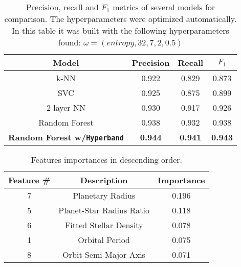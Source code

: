 \documentclass[11pt, a4paper]{article}
\begin{document}
  \begin{table}
    \centering
    \begin{tabular}{|c c c c|}
      \hline
      Model & Precision & Recall & $F_{1}$  \\
      \hline\hline
      k-NN & 0.922 & 0.829 & 0.873 \\
      \hline
      SVC & 0.925 & 0.875 & 0.899 \\
      \hline
      2-layer NN & 0.930 & 0.917 & 0.926 \\
      \hline
      Random Forest & 0.938 & 0.932 & 0.938 \\
      \hline
      \textbf{Random Forest w/\texttt{Hyperband}} & \textbf{0.944} & \textbf{0.941} & \textbf{0.943} \\
      \hline
    \end{tabular}
    \caption{Precision, recall and $F_{1}$ metrics of several models for comparison. The hyperparameters were optimized automatically. In this table it was built with the following hyperparameters found: $\omega = (entropy, 32, 7, 2, 0.5)$}
    \label{table:benchmark}
  \end{table}

  \begin{table}
    \centering
    \begin{tabular}{|c c c|}
    \hline
    Feature \# & Description & Importance \\
    \hline\hline
    7 & Planetary Radius & 0.196 \\
    5 & Planet-Star Radius Ratio & 0.118 \\
    6 & Fitted Stellar Density & 0.078 \\
    1 & Orbital Period & 0.075 \\
    8 & Orbit Semi-Major Axis & 0.071 \\
    \hline
    \end{tabular}
    \caption{Features importances in descending order.}
    \label{table:importances}
  \end{table}
\end{document}
